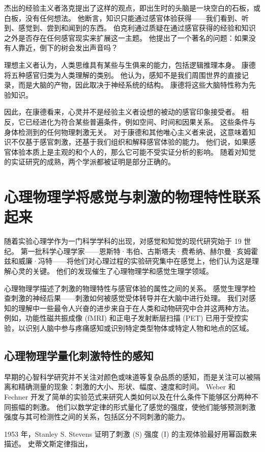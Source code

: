 杰出的经验主义者洛克提出了这样的观点，即出生时的头脑是一块空白的石板，或白板，没有任何想法。 他断言，知识只能通过感官体验获得——我们看到、听到、感觉到、尝到和闻到的东西。 伯克利通过质疑在通过感官获得的经验和知识之外是否存在任何感官现实来扩展这一主题。 他提出了一个著名的问题：如果没有人靠近，倒下的树会发出声音吗？

理想主义者认为，人类思维具有某些与生俱来的能力，包括逻辑推理本身。 康德将五种感官归类为人类理解的类别。 他认为，感知不是我们周围世界的直接记录，而是大脑的产物，因此取决于神经系统的结构。 康德将这些大脑特性称为先验知识。

因此，在康德看来，心灵并不是经验主义者设想的被动的感官印象接受者。 相反，它已经进化为符合某些普遍条件，例如空间、时间和因果关系。 这些条件与身体检测到的任何物理刺激无关。 对于康德和其他唯心主义者来说，这意味着知识不仅基于感官刺激，还基于我们组织和解释感官体验的能力。 他们说，如果感官体验本质上是主观的和个人的，那么它可能不受实证分析的影响。 随着对知觉的实证研究的成熟，两个学派都被证明是部分正确的。


\section{心理物理学将感觉与刺激的物理特性联系起来}
随着实验心理学作为一门科学学科的出现，对感觉和知觉的现代研究始于 19 世纪。 第一批科学心理学家——恩斯特·韦伯、古斯塔夫·费希纳、赫尔曼·亥姆霍兹和威廉·冯特——将他们对心理过程的实验研究集中在感觉上，他们认为这是理解心灵的关键。 他们的发现催生了心理物理学和感觉生理学领域。

心理物理学描述了刺激的物理特性与感官体验的属性之间的关系。 感觉生理学检查刺激的神经后果——刺激如何被感觉受体转导并在大脑中进行处理。 我们对感知的理解中一些最令人兴奋的进步来自于在人类和动物研究中合并这两种方法。 例如，功能性磁共振成像 (fMRI) 和正电子发射断层扫描 (PET) 已用于受控实验，以识别人脑中参与疼痛感知或识别特定类型物体或特定人物和地点的区域。


\subsection{心理物理学量化刺激特性的感知}

早期的心智科学研究并不关注对颜色或味道等复杂品质的感知，而是关注可以被隔离和精确测量的现象：刺激的大小、形状、幅度、速度和时间。 Weber 和 Fechner 开发了简单的实验范式来研究人类如何以及在什么条件下能够区分两种不同振幅的刺激。 他们以数学定律的形式量化了感觉的强度，使他们能够预测刺激强度与其可检测性之间的关系，包括区分不同刺激的能力。

1953 年，Stanley S. Stevens 证明了刺激 (S) 强度 (I) 的主观体验最好用幂函数来描述。 史蒂文斯定律指出，

